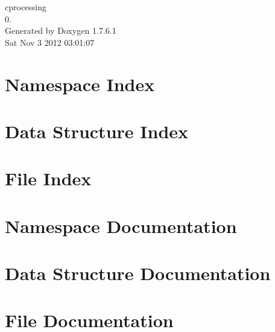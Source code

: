 \documentclass[a4paper]{book}
\begin{document}
\hypersetup{pageanchor=false,citecolor=blue}
\begin{titlepage}
\vspace*{7cm}
\begin{center}
{\Large cprocessing \\[1ex]\large 0. }\\
\vspace*{1cm}
{\large \-Generated by Doxygen 1.7.6.1}\\
\vspace*{0.5cm}
{\small Sat Nov 3 2012 03:01:07}\\
\end{center}
\end{titlepage}
\clearemptydoublepage
{}
\tableofcontents
\clearemptydoublepage
{}
\hypersetup{pageanchor=true,citecolor=blue}
\chapter{\-Namespace \-Index}

\chapter{\-Data \-Structure \-Index}

\chapter{\-File \-Index}

\chapter{\-Namespace \-Documentation}

\chapter{\-Data \-Structure \-Documentation}









\chapter{\-File \-Documentation}























\printindex
\end{document}
